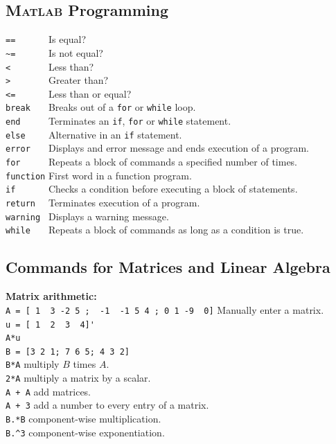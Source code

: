 \subsection*{\textsc{Matlab} Programming}
\verb&==      & Is equal?\\
\verb&~=      & Is not equal?\\
\verb&<       & Less than?\\
\verb&>       & Greater than?\\
\verb&<=      & Less than or equal?\\
\verb&break   & Breaks out of a \verb&for& or \verb&while& loop.\\
\verb&end     & Terminates an \verb&if&, \verb&for& or \verb&while& statement.\\
\verb&else    & Alternative in an \verb&if& statement.\\
\verb&error   & Displays and error message and ends execution of a program.\\
\verb&for     & Repeats a block of commands a specified number of times.\\
\verb&function& First word in a function program.\\
\verb&if      & Checks a condition before executing a block of statements.\\
\verb&return  & Terminates execution of a program.\\
\verb&warning & Displays a warning message.\\
\verb&while   & Repeats a block of commands as long as a condition is true.\\





\subsection*{Commands for Matrices and Linear Algebra}


{\bf Matrix arithmetic:}\\
\verb&A = [ 1  3 -2 5 ;  -1  -1 5 4 ; 0 1 -9  0]& \dotfill Manually enter a matrix. \\
\verb&u = [ 1  2  3  4]'&\\
\verb&A*u &\\
\verb&B = [3 2 1; 7 6 5; 4 3 2]&\\
\verb&B*A&     \dotfill multiply $B$ times $A$.\\
\verb&2*A&     \dotfill multiply a matrix by a scalar.\\
\verb&A + A&   \dotfill add matrices. \\
\verb&A + 3&   \dotfill add a number to every entry of a matrix. \\
\verb&B.*B&  \dotfill component-wise multiplication. \\
\verb&B.^3&  \dotfill component-wise exponentiation.


